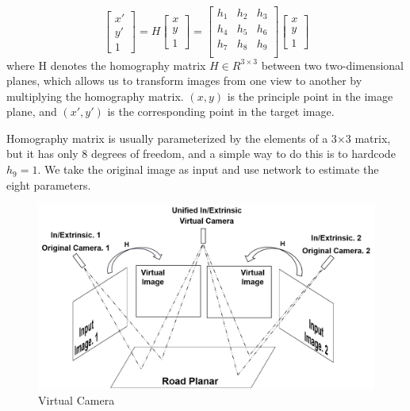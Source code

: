 \[
\left[ \begin{matrix}
   x'  \\
   y'  \\
   1
\end{matrix} \right]
=
H\left[ \begin{matrix}
   x  \\
   y  \\
   1
\end{matrix} \right]
=
\left[ \begin{matrix}
h_1 & h_2 & h_3  \\
h_4 & h_5 & h_6  \\
h_7 & h_8 & h_9  \\
\end{matrix} \right]
\left[ \begin{matrix}
x  \\
y  \\
1
\end{matrix} \right]
\]
where H denotes the homography matrix $H \in R^{3\times 3}$ between two two-dimensional planes,
which allows us to transform images from one view to another by multiplying the homography matrix.
$(x, y)$ is the principle point in the image plane, and $(x', y')$ is the corresponding point in the target image.

Homography matrix is usually parameterized by the elements of a 3×3 matrix,
but it has only 8 degrees of freedom, and a simple way to do this is to hardcode $h_9=1$.
We take the original image as input and use network to estimate the eight parameters.

\begin{figure}[hb]
    \centering
    \includegraphics[width=\linewidth]{asset/virtual_camera}
    \caption{Virtual Camera}
    \label{fig:Virtual Camera}
\end{figure}

